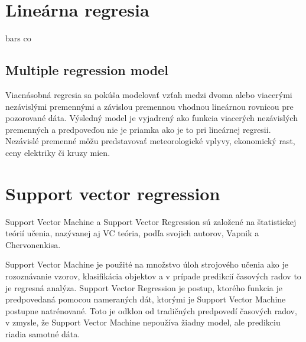 \documentclass[12pt,oneside,slovak,a4paper]{book}
\begin{document}
\section{Lineárna regresia}
bars co

\subsection{Multiple regression model}
Viacnásobná regresia sa pokúša modelovať vzťah medzi dvoma alebo viacerými
nezávislými premennými a závislou premennou vhodnou lineárnou rovnicou pre
pozorované dáta. Výsledný model je vyjadrený ako funkcia viacerých nezávislých
premenných a predpoveďou nie je priamka ako je to pri lineárnej
regresii\cite{Grmanova2016}.
Nezávislé premenné môžu predstavovať meteorologické vplyvy, ekonomický rast,
ceny elektriky či kruzy mien\cite{KumarSingh2013}.

\section{Support vector regression}
Support Vector Machine a Support Vector Regression sú založené na štatistickej
teórií učenia, nazývanej aj VC teória, podľa svojich autorov, Vapnik
a Chervonenkisa.

Support Vector Machine je použité na množstvo úloh strojového učenia ako je
rozoznávanie vzorov, klasifikácia objektov a v prípade predikcií časových
radov to je regresná analýza. Support Vector Regression je postup, ktorého
funkcia je predpovedaná pomocou nameraných dát, ktorými je Support Vector
Machine postupne natrénované. Toto je odklon od tradičných predpovedí časových
radov, v zmysle, že Support Vector Machine nepoužíva žiadny model, ale
predikciu riadia samotné dáta\cite{Sapankevych2009}.

%

\end{document}
